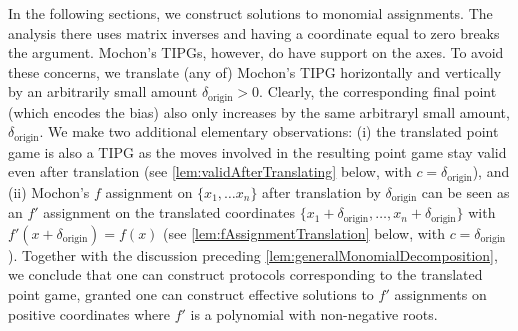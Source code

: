 \documentclass{theoretics}
\newcommand{\atul}[1]{#1} %
\newcommand{\dorigin}[0]{\delta_{\textrm{origin}}} %
\begin{document}
In the following sections, we construct solutions to monomial assignments. The analysis there uses matrix inverses and having a coordinate equal to zero breaks the argument. \atul{Mochon's TIPGs, however, do have support on the axes. To avoid these concerns, we translate (any of) Mochon's TIPG horizontally and vertically by an arbitrarily small amount $\dorigin>0$. Clearly, the corresponding final point (which encodes the bias) also only increases by the same arbitraryl small amount, $\dorigin$. We make two additional elementary observations: (i) the translated point game is also a TIPG as the moves involved in the resulting point game stay valid even after translation (see \cref{lem:validAfterTranslating} below, with $c=\dorigin$), and (ii) Mochon's $f$ assignment on $\{x_1,\dots x_n\}$ after translation by $\dorigin$ can be seen as an $f'$ assignment on the translated coordinates $\{x_1 +\dorigin,\dots ,x_n+\dorigin \}$ with $f'(x + \dorigin) = f(x)$ (see \cref{lem:fAssignmentTranslation} below, with $c=\dorigin$). %
  Together with the discussion preceding \cref{lem:generalMonomialDecomposition}, we conclude that one can construct protocols corresponding to the translated point game, granted one can construct effective solutions to $f'$ assignments on positive coordinates where $f'$ is a polynomial with non-negative roots.}

%
%
%
%
%
\end{document}
